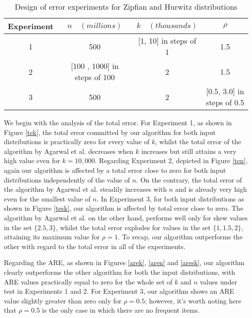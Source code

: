 \documentclass[final,3p,times]{elsarticle}
\begin{document}
\begin{table}
\renewcommand{\arraystretch}{1.3}
 \caption{Design of  error experiments for Zipfian and Hurwitz distributions }
      \label{error-experiments}
	\centering
	\tiny
	    \begin{tabular}{|c|c|c|c|}
    \hline
    Experiment & $n \quad (millions)$ & $k \quad (thousands)$ & $\rho$  \\ \hline
    1 &  500 &[1, 10] in steps of 1 & 1.5 \\ \hline
    2 &  [100 , 1000] in steps of 100 & 2 & 1.5 \\ \hline
    3 &  500 & 2 & [0.5, 3.0] in steps of 0.5 \\ \hline
    \end{tabular}
    \normalsize
    \end{table}


 
We begin with the analysis of the total error. For Experiment 1, as shown in Figure \ref{tek}, the total error committed by our algorithm for both input distributions is practically zero for every value of $k$, whilst the total error of the algorithm by Agarwal et al. decreases when $k$ increases but still attains a very high value even for $k = 10,000$. Regarding Experiment 2, depicted in Figure \ref{ten}, again our algorithm is affected by a total error close to zero for both input distributions independently of the value of $n$. On the contrary, the total error of the algorithm by Agarwal et al. steadily increases with $n$ and is already very high even for the smallest value of $n$. In Experiment 3, for both input distributions as shown in Figure \ref{tesk}, our algorithm is affected by total error close to zero. The algorithm by Agarwal et al. on the other hand, performs well only for skew values in the set $\{2.5, 3\}$, whilst the total error explodes for values in the set $\{1, 1.5, 2\}$, attaining its maximum value for $\rho = 1$. To recap, our algorithm outperforms the other with regard to the total error in all of the experiments.

Regarding the ARE, as shown in Figures \ref{arek}, \ref{aren} and \ref{aresk}, our algorithm clearly outperforms the other algorithm for both the input distributions, with ARE values practically equal to zero for the whole set of $k$ and $n$ values under test in Experiments 1 and 2. For Experiment 3, our algorithm shows an ARE value slightly greater than zero  only for $\rho = 0.5$; however, it's worth noting here that $\rho = 0.5$ is the only case in which there are no frequent items.
\end{document}
